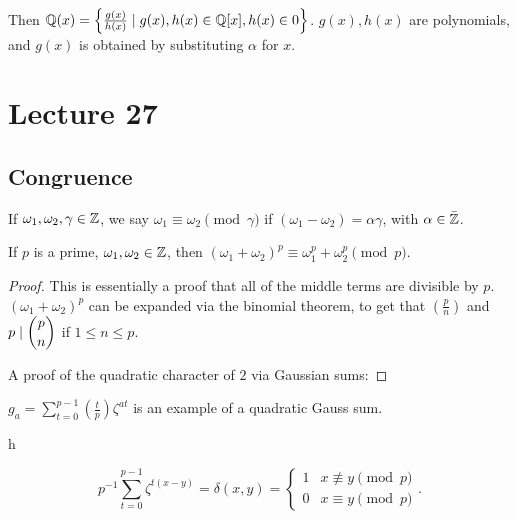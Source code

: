 \documentclass{article}
\begin{document}
Then $\mathbb Q(x) = \left\{ \frac{g(x)}{h(x)} \mid g(x), h(x) \in \mathbb Q[x], h(x) \in 0\right\}$. $g(x), h(x)$ are polynomials, and $g(x)$ is obtained by substituting $\alpha$ for $x$.

\section{Lecture 27} 
\subsection{Congruence} 
If $\omega_1, \omega_2, \gamma \in \mathbb Z$, we say $\omega_1 \equiv \omega_2 \pmod \gamma$ if $(\omega_1 - \omega_2) = \alpha \gamma$, with $\alpha \in \bar{\mathbb Z}$.

\begin{lemma}
	If $p$ is a prime, $\omega_1, \omega_2 \in \mathbb Z$, then $(\omega_1 + \omega_2)^p \equiv \omega_1^p + \omega_2^p \pmod p$.
\end{lemma}

\begin{proof}
	This is essentially a proof that all of the middle terms are divisible by $p$.
	$(\omega_1 + \omega_2)^p$ can be expanded via the binomial theorem, to get 
	that $\left( \frac{p}{n} \right)$ and $p \mid \dbinom{p}{n}$ if $1 \leq n \leq p$.

	A proof of the quadratic character of $2$ via Gaussian sums:
\end{proof}

\begin{definition}
	$g_a = \sum_{t = 0}^{p-1} \left(\frac{t}{p}\right) \zeta^{at}$ is an example of a quadratic Gauss sum.
\end{definition}

\begin{lemma}
	h
\end{lemma}

\begin{corollary}
	\[p^{-1} \sum_{t = 0}^{p - 1} \zeta^{t(x - y)} = \delta(x, y) = \begin{cases} 1 & x \not \equiv y \pmod p \\ 0 & x \equiv y \pmod p \end{cases}.\] 
\end{corollary} 
\end{document}
